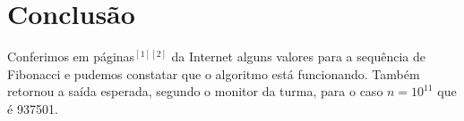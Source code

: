 \section{Conclusão}

Conferimos em páginas$^{[1][2]}$ da Internet alguns valores para a sequência de Fibonacci e pudemos constatar que o algoritmo está funcionando. Também retornou a saída esperada, segundo o monitor da turma, para o caso $n = 10^{11}$ que é 937501.
